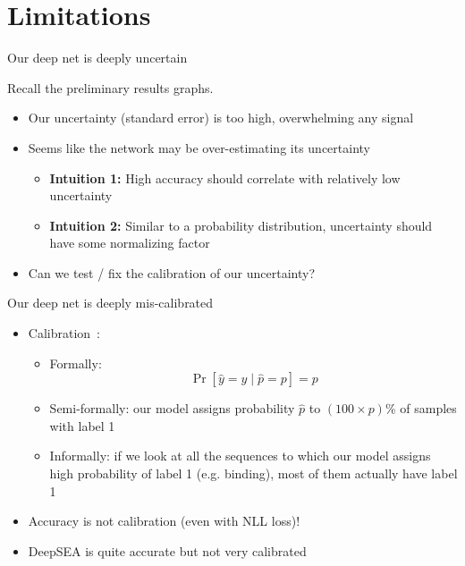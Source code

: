\documentclass[pdf]{beamer} %
\begin{document}
\section{Limitations}

\begin{frame}[t]{Our deep net is deeply uncertain}
    \begin{block}{} Recall the preliminary results graphs. \end{block} 
    \begin{itemize}
        \item Our uncertainty (standard error) is too high, overwhelming any signal
        \item Seems like the network may be over-estimating its uncertainty
            \begin{itemize}
                \item \textbf{Intuition 1:} High accuracy should correlate with relatively low uncertainty
                \item \textbf{Intuition 2:} Similar to a probability distribution, uncertainty should have some normalizing factor
            \end{itemize}
        \item Can we test / fix the calibration of our uncertainty?
    \end{itemize}
\end{frame}

\begin{frame}[t]{Our deep net is deeply mis-calibrated}
    \begin{itemize}
        \item Calibration~\cite{Guo2017-qx}:
            \begin{itemize}
                \item Formally: \[ \Pr[\hat{y} = y \mid \hat{p} = p] =  p \]
                \item Semi-formally: our model assigns probability \( \hat{p} \) to \( (100 \times p) \)\% of samples with label 1
                \item Informally: if we look at all the sequences to which our model assigns high probability of label 1 (e.g. binding), most of them actually have label 1
            \end{itemize}
        \item Accuracy is not calibration (even with NLL loss)!
        \item DeepSEA is quite accurate but not very calibrated
    \end{itemize}
\end{frame}
\end{document}

